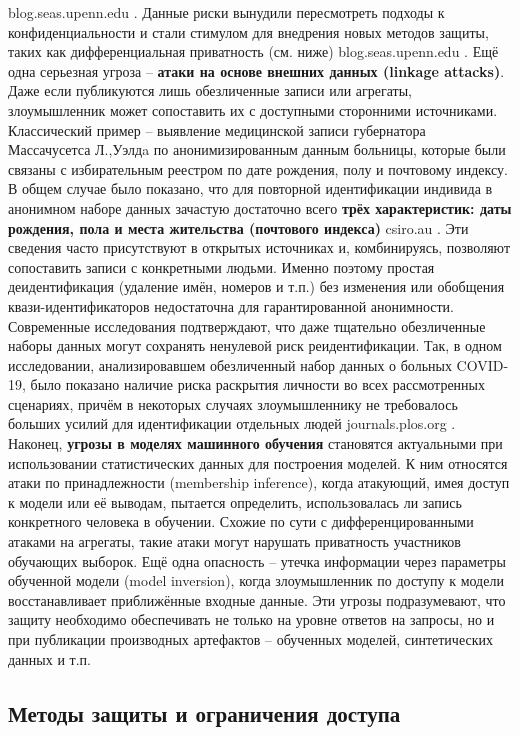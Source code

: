 blog.seas.upenn.edu
. Данные риски вынудили пересмотреть подходы к конфиденциальности и стали стимулом для внедрения новых методов защиты, таких как дифференциальная приватность (см. ниже)
blog.seas.upenn.edu
. Ещё одна серьезная угроза – \textbf{атаки на основе внешних данных (linkage attacks)}. Даже если публикуются лишь обезличенные записи или агрегаты, злоумышленник может сопоставить их с доступными сторонними источниками. Классический пример – выявление медицинской записи губернатора Массачусетса Л.,Уэлдa по анонимизированным данным больницы, которые были связаны с избирательным реестром по дате рождения, полу и почтовому индексу. В общем случае было показано, что для повторной идентификации индивида в анонимном наборе данных зачастую достаточно всего \textbf{трёх характеристик: даты рождения, пола и места жительства (почтового индекса)}
csiro.au
. Эти сведения часто присутствуют в открытых источниках и, комбинируясь, позволяют сопоставить записи с конкретными людьми. Именно поэтому простая деидентификация (удаление имён, номеров и т.п.) без изменения или обобщения квази-идентификаторов недостаточна для гарантированной анонимности. Современные исследования подтверждают, что даже тщательно обезличенные наборы данных могут сохранять ненулевой риск реидентификации. Так, в одном исследовании, анализировавшем обезличенный набор данных о больных COVID-19, было показано наличие риска раскрытия личности во всех рассмотренных сценариях, причём в некоторых случаях злоумышленнику не требовалось больших усилий для идентификации отдельных людей
journals.plos.org
. Наконец, \textbf{угрозы в моделях машинного обучения} становятся актуальными при использовании статистических данных для построения моделей. К ним относятся атаки по принадлежности (membership inference), когда атакующий, имея доступ к модели или её выводам, пытается определить, использовалась ли запись конкретного человека в обучении. Схожие по сути с дифференцированными атаками на агрегаты, такие атаки могут нарушать приватность участников обучающих выборок. Ещё одна опасность – утечка информации через параметры обученной модели (model inversion), когда злоумышленник по доступу к модели восстанавливает приближённые входные данные. Эти угрозы подразумевают, что защиту необходимо обеспечивать не только на уровне ответов на запросы, но и при публикации производных артефактов – обученных моделей, синтетических данных и т.п. \subsection{Методы защиты и ограничения доступа}
